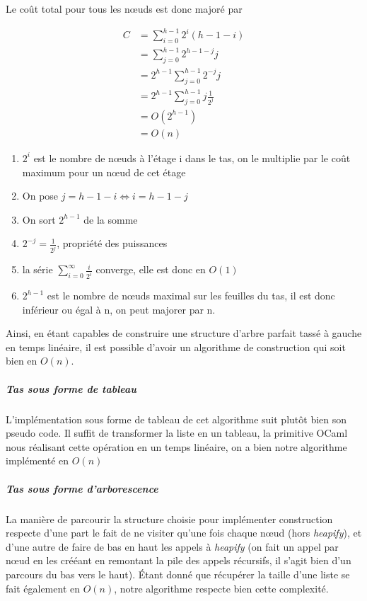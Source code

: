 \documentclass[12pt,a4paper]{article}
\begin{document}
\newpage
Le coût total pour tous les nœuds est donc majoré par 

\begin{align}
C &= \sum_{i = 0}^{h-1} 2^i (h - 1 - i)\\
&=  \sum_{j = 0}^{h-1} 2^{h-1-j} j\\
&= 2^{h-1} \sum_{j=0}^{h-1} 2^{-j} j\\
&= 2^{h-1} \sum_{j=0}^{h-1} j \frac{1}{2^j} \\
&= O(2^{h-1})\\
&= O(n)
\end{align}

\begin{enumerate}[label=(\arabic*)]
\item $2^i$ est le nombre de nœuds à l'étage i dans le tas, on le multiplie par le coût maximum pour un nœud de cet étage
\item On pose $j = h-1 -i \iff i = h-1 -j$
\item On sort $2^{h-1}$ de la somme
\item $2^{-j} = \frac{1}{2^j}$, propriété des puissances
\item la série $\sum_{i = 0}^{\infty} \frac{i}{2^i}$ converge, elle est donc en $O(1)$
\item $2^{h-1}$ est le nombre de nœuds maximal sur les feuilles du tas, il est donc inférieur ou égal à n, on peut majorer par n.
\end{enumerate}

Ainsi, en étant capables de construire une structure d'arbre parfait tassé à gauche en temps linéaire, il est possible d'avoir un algorithme de construction qui soit bien en $O(n)$.

\subparagraph{Tas sous forme de tableau}

L'implémentation sous forme de tableau de cet algorithme suit plutôt bien son pseudo code. Il suffit de transformer la liste en un tableau, la primitive OCaml nous réalisant cette opération en un temps linéaire, on a bien notre algorithme implémenté en $O(n)$

\subparagraph{Tas sous forme d'arborescence}

La manière de parcourir la structure choisie pour implémenter construction respecte d'une part le fait de ne visiter qu'une fois chaque nœud (hors \textit{heapify}), et d'une autre de faire de bas en haut les appels à \textit{heapify} (on fait un appel par nœud en les crééant en remontant la pile des appels récursifs, il s'agit bien d'un parcours du bas vers le haut). Étant donné que récupérer la taille d'une liste se fait également en $O(n)$, notre algorithme respecte bien cette complexité.
\end{document}
